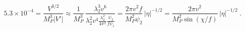 \begin{equation}
5.3\times 10^{-4}= \frac{V^{3/2}}{M_P^3 |V'|} \approx
\frac{1}{M_P^3}\,\frac{\lambda_2^3 v^6}{
\lambda_2^2 v^4 \frac{\lambda_2^2}{4\pi^2}
\frac{\psi_2}{f\psi_1}}
= \frac{2\pi v^2 f}{M_P^2 \psi_{2}} \, |\eta|^{-1/2}
= \frac{2\pi v^2 }{M_P^2 \sin( \chi /f)} \, |\eta|^{-1/2} \;.
\end{equation}

